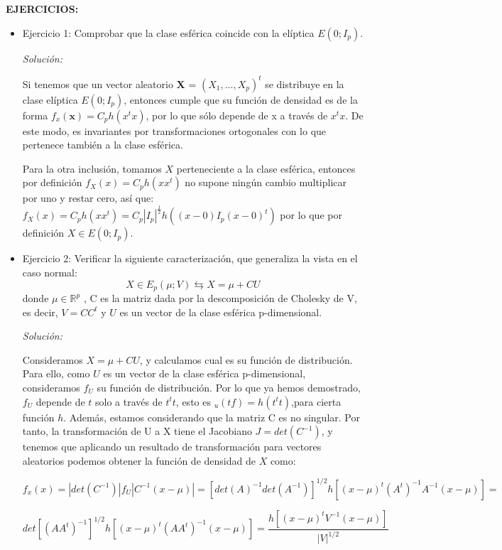 \documentclass{article}
\theoremstyle{theorem-style}  %
\theoremstyle{definition}
\theoremstyle{example-style}
\begin{document}
	\textbf{EJERCICIOS:}
		\begin{itemize}
			\item Ejercicio 1: Comprobar que la clase esférica coincide con la elíptica $E(0; I_p )$.
			
			\textit{Solución:} 
			
			Si tenemos que un vector aleatorio \textbf{X} = $(X_1, ..., X_p)^t$ se distribuye en la clase elíptica $E(0; I_p )$, entonces cumple que su función de densidad es de la forma $f_x(\textbf{x}) = C_p h (x^tx)$, por lo que sólo depende de x a través de $x^tx$. De este modo, es invariantes por transformaciones ortogonales con lo que pertenece también a la clase esférica. 
			
			Para la otra inclusión, tomamos $X$ perteneciente a la clase esférica, entonces por definición $f_{X}(x) = C_{p}h(x x^t)$ no supone ningún cambio multiplicar por uno y restar cero, así que:
			$f_{X}(x) = C_{p}h(x x^t) =  C_{p} |I_{p}|^{\frac{1}{2}}h((x-0) I_p(x-0)^t)$ por lo que por definición $X \in E(0; I_p)$.
			
			\item Ejercicio 2: Verificar la siguiente caracterización, que generaliza la vista en el caso normal: $$ X \in E_p(\mu; V) \leftrightarrows X = \mu + CU $$ donde $\mu \in \mathbb{R}^p$ , C es la matriz dada por la descomposición de Cholesky de V, es decir, $V=CC^t$ y $U$ es un vector de la clase esférica p-dimensional.
			
			\textit{Solución:}
			
				Consideramos $X = \mu + CU $, y calculamos cual es su función de distribución. Para ello, como $U$ es un vector de la clase esférica p-dimensional, consideramos $f_U$ su función de distribución. Por lo que ya hemos demostrado, $f_U$ depende de $t$ solo a través de $t^tt$, esto es $_u(tf)=h(t^tt)$,para cierta función $h$. Además, estamos considerando que la matriz C es no singular. Por tanto, la transformación de U a X tiene el Jacobiano $J = det(C^{-1})$, y tenemos que aplicando un resultado de transformación para vectores aleatorios podemos obtener la función de densidad de $X$ como:
				
				\[
					f_x(x) = |det(C^{-1})| f_U |C^{-1}(x-\mu)| = [det(A)^{-1}det(A^{-1})]^{1/2}h[(x-\mu)^t(A^t)^{-1}A^{-1}(x-\mu)] =
				\]
								
				\[
									det[(AA^t)^{-1}]^{1/2}h[(x-\mu)^t(AA^t)^{-1}(x-\mu)] = \frac{h[(x-\mu)^tV^{-1}(x-\mu)]}{|V|^{1/2}}				
				\]
				
				
				

\end{itemize}
\end{document}
